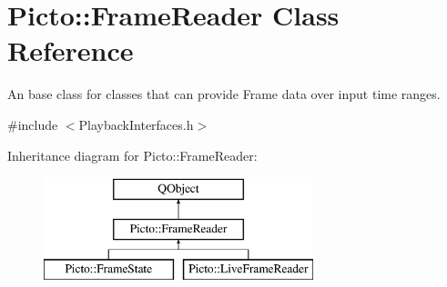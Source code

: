 \hypertarget{class_picto_1_1_frame_reader}{\section{Picto\-:\-:Frame\-Reader Class Reference}
\label{class_picto_1_1_frame_reader}
}


An base class for classes that can provide Frame data over input time ranges.  




{\ttfamily \#include $<$Playback\-Interfaces.\-h$>$}

Inheritance diagram for Picto\-:\-:Frame\-Reader\-:\begin{figure}[H]
\begin{center}
\leavevmode
\includegraphics[height=3.000000cm]{class_picto_1_1_frame_reader}
\end{center}
\end{figure}
